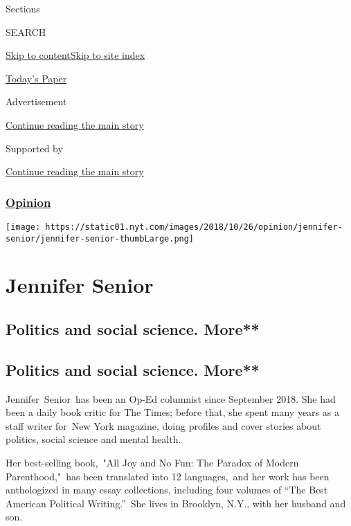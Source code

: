 Sections

SEARCH

\protect\hyperlink{site-content}{Skip to
content}\protect\hyperlink{site-index}{Skip to site index}

\href{https://myaccount.nytimes.com/auth/login?response_type=cookie\&client_id=vi}{}

\href{https://www.nytimes.com/section/todayspaper}{Today's Paper}

Advertisement

\protect\hyperlink{after-top}{Continue reading the main story}

Supported by

\protect\hyperlink{after-sponsor}{Continue reading the main story}

\hypertarget{opinion}{%
\subsubsection{\texorpdfstring{\href{/section/opinion}{Opinion}}{Opinion}}\label{opinion}}

\texttt{[image: https://static01.nyt.com/images/2018/10/26/opinion/jennifer-senior/jennifer-senior-thumbLarge.png]}

\hypertarget{jennifer-senior}{%
\section{Jennifer Senior}\label{jennifer-senior}}

\hypertarget{politics-and-social-science-more}{%
\subsection{Politics and social science.
More**}\label{politics-and-social-science-more}}

\hypertarget{politics-and-social-science-more-1}{%
\subsection{Politics and social science.
More**}\label{politics-and-social-science-more-1}}

Jennifer~Senior~has been an Op-Ed columnist since September 2018. She
had been a daily book critic for The Times; before that, she spent many
years as a staff writer for~New York magazine, doing profiles and cover
stories about politics, social science and mental health.~

Her best-selling book,~"All Joy and No Fun: The Paradox of Modern
Parenthood,"~has been translated into 12 languages,~and her work has
been anthologized in many essay collections, including four volumes of
``The Best American Political Writing.''~She lives in Brooklyn, N.Y.,
with her husband and son.~

